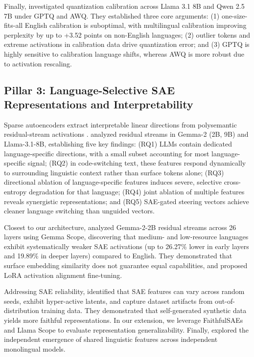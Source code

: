 \documentclass[11pt]{article}
\begin{document}
Finally, \citet{chimoto2026calibrating} investigated quantization calibration across Llama 3.1 8B and Qwen 2.5 7B under GPTQ and AWQ. They established three core arguments: (1) one-size-fits-all English calibration is suboptimal, with multilingual calibration improving perplexity by up to +3.52 points on non-English languages; (2) outlier tokens and extreme activations in calibration data drive quantization error; and (3) GPTQ is highly sensitive to calibration language shifts, whereas AWQ is more robust due to activation rescaling.

\subsection{Pillar 3: Language-Selective SAE Representations and Interpretability}
Sparse autoencoders extract interpretable linear directions from polysemantic residual-stream activations \citep{lieberum2024gemma, he2024llama}. \citet{deng2025unveiling} analyzed residual streams in Gemma-2 (2B, 9B) and Llama-3.1-8B, establishing five key findings: (RQ1) LLMs contain dedicated language-specific directions, with a small subset accounting for most language-specific signal; (RQ2) in code-switching text, these features respond dynamically to surrounding linguistic context rather than surface tokens alone; (RQ3) directional ablation of language-specific features induces severe, selective cross-entropy degradation for that language; (RQ4) joint ablation of multiple features reveals synergistic representations; and (RQ5) SAE-gated steering vectors achieve cleaner language switching than unguided vectors.

Closest to our architecture, \citet{sin2025uncovering} analyzed Gemma-2-2B residual streams across 26 layers using Gemma Scope, discovering that medium- and low-resource languages exhibit systematically weaker SAE activations (up to 26.27\% lower in early layers and 19.89\% in deeper layers) compared to English. They demonstrated that surface embedding similarity does not guarantee equal capabilities, and proposed LoRA activation alignment fine-tuning.

Addressing SAE reliability, \citet{cho2025faithfulsae} identified that SAE features can vary across random seeds, exhibit hyper-active latents, and capture dataset artifacts from out-of-distribution training data. They demonstrated that self-generated synthetic data yields more faithful representations. In our extension, we leverage FaithfulSAEs and Llama Scope \citep{he2024llama} to evaluate representation generalizability. Finally, \citet{zhou2025extended} explored the independent emergence of shared linguistic features across independent monolingual models.
\end{document}
